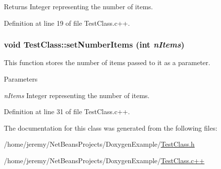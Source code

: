\begin{DoxyReturn}{Returns}
Integer representing the number of items. 
\end{DoxyReturn}


Definition at line 19 of file TestClass.c++.

\hypertarget{class_test_class_ad0423c0877ebf6531514b14fa8683bea}{
\subsubsection[{setNumberItems}]{\setlength{\rightskip}{0pt plus 5cm}void TestClass::setNumberItems (int {\em nItems})}}
\label{class_test_class_ad0423c0877ebf6531514b14fa8683bea}
This function stores the number of items passed to it as a parameter.


\begin{DoxyParams}{Parameters}
\item[{\em nItems}]Integer representing the number of items. \end{DoxyParams}


Definition at line 31 of file TestClass.c++.



The documentation for this class was generated from the following files:\begin{DoxyCompactItemize}
\item 
/home/jeremy/NetBeansProjects/DoxygenExample/\hyperlink{_test_class_8h}{TestClass.h}\item 
/home/jeremy/NetBeansProjects/DoxygenExample/\hyperlink{_test_class_8c_09_09}{TestClass.c++}\end{DoxyCompactItemize}
